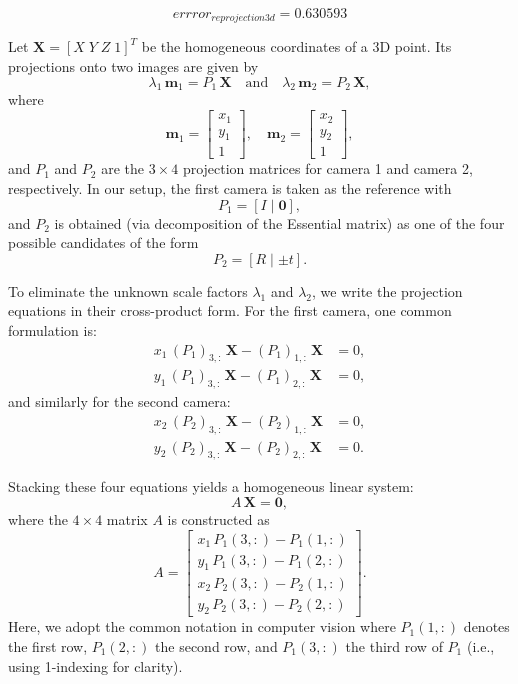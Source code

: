\documentclass[onecolumn,10pt]{article}
\begin{document}
\begin{equation}
errror_{reprojection3d}=0.630593 \label{eq:reprojection_error_3d}
\end{equation}

Let \(\mathbf{X} = [X \; Y \; Z \; 1]^T\) be the homogeneous coordinates of a 3D point. Its projections onto two images are given by
\[
\lambda_1\,\mathbf{m}_1 = P_1\,\mathbf{X} \quad \text{and} \quad \lambda_2\,\mathbf{m}_2 = P_2\,\mathbf{X},
\]
where
\[
\mathbf{m}_1 = \begin{bmatrix} x_1 \\ y_1 \\ 1 \end{bmatrix}, \quad
\mathbf{m}_2 = \begin{bmatrix} x_2 \\ y_2 \\ 1 \end{bmatrix},
\]
and \(P_1\) and \(P_2\) are the \(3\times4\) projection matrices for camera 1 and camera 2, respectively. In our setup, the first camera is taken as the reference with
\[
P_1 = [I \mid \mathbf{0}],
\]
and \(P_2\) is obtained (via decomposition of the Essential matrix) as one of the four possible candidates of the form
\[
P_2 = [R \mid \pm t].
\]

To eliminate the unknown scale factors \(\lambda_1\) and \(\lambda_2\), we write the projection equations in their cross-product form. For the first camera, one common formulation is:
\[
\begin{aligned}
x_1\,(P_1)_{3,:}\,\mathbf{X} - (P_1)_{1,:}\,\mathbf{X} &= 0,\\[1mm]
y_1\,(P_1)_{3,:}\,\mathbf{X} - (P_1)_{2,:}\,\mathbf{X} &= 0,
\end{aligned}
\]
and similarly for the second camera:
\[
\begin{aligned}
x_2\,(P_2)_{3,:}\,\mathbf{X} - (P_2)_{1,:}\,\mathbf{X} &= 0,\\[1mm]
y_2\,(P_2)_{3,:}\,\mathbf{X} - (P_2)_{2,:}\,\mathbf{X} &= 0.
\end{aligned}
\]

Stacking these four equations yields a homogeneous linear system:
\[
A\,\mathbf{X} = \mathbf{0},
\]
where the \(4\times4\) matrix \(A\) is constructed as
\[
A = \begin{bmatrix}
x_1\,P_1(3,:) - P_1(1,:) \\[1mm]
y_1\,P_1(3,:) - P_1(2,:) \\[1mm]
x_2\,P_2(3,:) - P_2(1,:) \\[1mm]
y_2\,P_2(3,:) - P_2(2,:)
\end{bmatrix}.
\]
Here, we adopt the common notation in computer vision where \(P_1(1,:)\) denotes the first row, \(P_1(2,:)\) the second row, and \(P_1(3,:)\) the third row of \(P_1\) (i.e., using 1-indexing for clarity).
\end{document}
